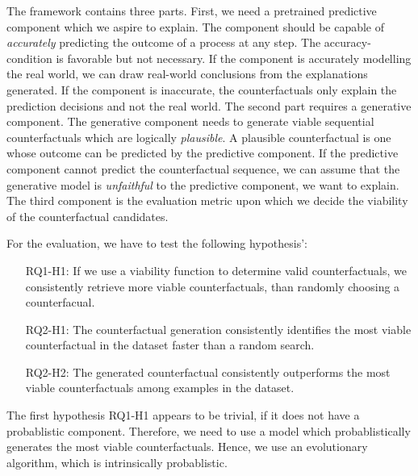 \documentclass[./../../paper.tex]{subfiles}
\begin{document}
\noindent The framework contains three parts. First, we need a pretrained predictive component which we aspire to explain. The component should be capable of \emph{accurately} predicting the outcome of a process at any step. The accuracy-condition is favorable but not necessary. If the component is accurately modelling the real world, we can draw real-world conclusions from the explanations generated. If the component is inaccurate, the counterfactuals only explain the prediction decisions and not the real world. The second part requires a generative component. The generative component needs to generate viable sequential counterfactuals which are logically \emph{plausible}. A plausible counterfactual is one whose outcome can be  predicted by the predictive component. If the predictive component cannot predict the counterfactual sequence, we can assume that the generative model is \emph{unfaithful} to the predictive component, we want to explain. The third component is the evaluation metric upon which we decide the viability of the counterfactual candidates.

For the evaluation, we have to test the following hypothesis': 
\begin{itemize}
    \item[RQ1-H1:] If we use a viability function to determine valid counterfactuals, we consistently retrieve more viable counterfactuals, than randomly choosing a counterfacual.
    \item[RQ2-H1:] The counterfactual generation consistently identifies the most viable counterfactual in the dataset faster than a random search.
    \item[RQ2-H2:] The generated counterfactual consistently outperforms the most viable counterfactuals among examples in the dataset.  
\end{itemize}

The first hypothesis RQ1-H1 appears to be trivial, if it does not have a probablistic component. Therefore, we need to use a model which probablistically generates the most viable counterfactuals. Hence, we use an evolutionary algorithm, which is intrinsically probablistic. 
\end{document}
